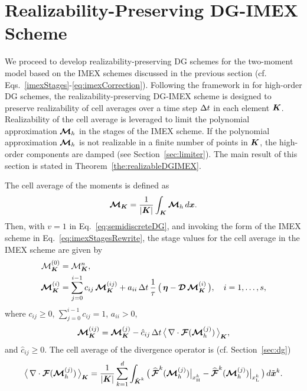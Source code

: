 \section{Realizability-Preserving DG-IMEX Scheme}
\label{sec:realizableDGIMEX}

We proceed to develop realizability-preserving DG schemes for the two-moment model based on the IMEX schemes discussed in the previous section (cf. Eqs.~\eqref{imexStages}-\eqref{eq:imexCorrection}).  
Following the framework in \cite{zhangShu_2010b} for high-order DG schemes, the realizability-preserving DG-IMEX scheme is designed to preserve realizability of cell averages over a time step $\Delta t$ in each element $\boldsymbol{K}$.  
Realizability of the cell average is leveraged to limit the polynomial approximation $\boldsymbol{\mathcal{M}}_{h}$ in the stages of the IMEX scheme.  
If the polynomial approximation $\boldsymbol{\mathcal{M}}_{h}$ is not realizable in a finite number of points in $\boldsymbol{K}$, the high-order components are damped (see Section~\ref{sec:limiter}).  
The main result of this section is stated in Theorem~\ref{the:realizableDGIMEX}.  

The cell average of the moments is defined as
\begin{equation}
  \boldsymbol{\mathcal{M}}_{\boldsymbol{K}}
  =\frac{1}{|\boldsymbol{K}|}\int_{\boldsymbol{K}}\boldsymbol{\mathcal{M}}_{h}\,d\boldsymbol{x}.  
\end{equation}
Then, with $v=1$ in Eq.~\eqref{eq:semidiscreteDG}, and invoking the form of the IMEX scheme in Eq.~\eqref{eq:imexStagesRewrite}, the stage values for the cell average in the IMEX scheme are given by
\begin{align}
  \mathcal{M}_{\boldsymbol{K}}^{(0)}
  &=\mathcal{M}_{\boldsymbol{K}}^{n}, \nonumber \\
  \boldsymbol{\mathcal{M}}_{\boldsymbol{K}}^{(i)}
  &=\sum_{j=0}^{i-1}c_{ij}\,\boldsymbol{\mathcal{M}}_{\boldsymbol{K}}^{(ij)}
  +a_{ii}\,\Delta t\,\frac{1}{\tau}\,\big(\,\boldsymbol{\eta}-\boldsymbol{\mathcal{D}}\,\boldsymbol{\mathcal{M}}_{\boldsymbol{K}}^{(i)}\,\big), \quad i=1,\ldots,s,
  \label{eq:imexStagesCellAverage}
\end{align}
where $c_{ij}\ge0$, $\sum_{j=0}^{i-1}c_{ij}=1$, $a_{ii}>0$, 
\begin{equation}
  \boldsymbol{\mathcal{M}}_{\boldsymbol{K}}^{(ij)}
  =\boldsymbol{\mathcal{M}}_{\boldsymbol{K}}^{(j)}-\hat{c}_{ij}\,\Delta t\,\big\langle\,\nabla\cdot\boldsymbol{\mathcal{F}}(\boldsymbol{\mathcal{M}}_{h}^{(j)})\,\big\rangle_{\boldsymbol{K}},
\end{equation}
and $\hat{c}_{ij}\ge0$.  
The cell average of the divergence operator is (cf. Section~\ref{sec:dg})
\begin{equation}
  \big\langle\,\nabla\cdot\boldsymbol{\mathcal{F}}(\boldsymbol{\mathcal{M}}_{h}^{(j)})\,\big\rangle_{\boldsymbol{K}}
  =\frac{1}{|\boldsymbol{K}|}\sum_{k=1}^{d}\int_{\tilde{\boldsymbol{K}}^{k}}
  \big(\,\widehat{\boldsymbol{\mathcal{F}}}^{k}(\boldsymbol{\mathcal{M}}_{h}^{(j)})\big|_{x_{{\rm H}}^{k}}-\widehat{\boldsymbol{\mathcal{F}}}^{k}(\boldsymbol{\mathcal{M}}_{h}^{(j)})\big|_{x_{{\rm L}}^{k}}\,\big)\,d\tilde{\boldsymbol{x}}^{k}.  
\end{equation}

